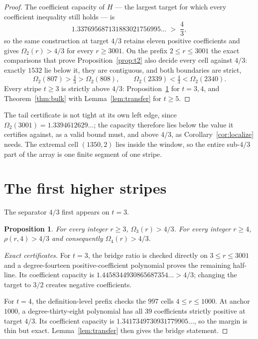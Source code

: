 \documentclass[11pt,a4paper]{article}
\theoremstyle{plain}
\newtheorem{proposition}[theorem]{Proposition}
\theoremstyle{remark}
\begin{document}
\begin{proof}
The coefficient capacity of $H$ --- the largest target for which every
coefficient inequality still holds --- is
\[
 1.337695687131883021756995\ldots\;>\;\frac43 ,
\]
so the same construction at target $4/3$ retains eleven positive
coefficients and gives $\Omega_2(r)>4/3$ for every $r\ge3001$.  On the prefix
$2\le r\le3001$ the exact comparisons that prove Proposition~\ref{prop:t2}
also decide every cell against $4/3$: exactly $1532$ lie below it, they are
contiguous, and both boundaries are strict,
\[
 \Omega_2(807)>\tfrac43>\Omega_2(808),
 \qquad
 \Omega_2(2339)<\tfrac43<\Omega_2(2340).
\]
Every stripe $t\ge3$ is strictly above $4/3$: Proposition~\ref{prop:t3t4}
for $t=3,4$, and Theorem~\ref{thm:bulk} with Lemma~\ref{lem:transfer} for
$t\ge5$.
\end{proof}

The tail certificate is not tight at its own left edge, since
$\Omega_2(3001)=1.3394612629\ldots$; the capacity therefore lies below the
value it certifies against, as a valid bound must, and above $4/3$, as
Corollary~\ref{cor:localize} needs.  The extremal cell $(1350,2)$ lies inside
the window, so the entire sub-$4/3$ part of the array is one finite segment
of one stripe.

\section{The first higher stripes}\label{sec:firststripes}

The separator $4/3$ first appears on $t=3$.

\begin{proposition}\label{prop:t3t4}
For every integer $r\ge3$, $\Omega_3(r)>4/3$.  For every integer $r\ge4$,
$\rho(r,4)>4/3$ and consequently $\Omega_4(r)>4/3$.
\end{proposition}

\begin{proof}[Exact certificates]
For $t=3$, the bridge ratio is checked directly on $3\le r\le3001$ and a
degree-fourteen positive-coefficient polynomial proves the remaining
half-line.  Its coefficient capacity is
$1.4458344930865687354\ldots>4/3$; changing the target to $3/2$ creates
negative coefficients.

For $t=4$, the definition-level prefix checks the $997$ cells
$4\le r\le1000$.  At anchor $1000$, a degree-thirty-eight polynomial has all
$39$ coefficients strictly positive at target $4/3$.  Its coefficient
capacity is $1.3417349730931779905\ldots$, so the margin is thin but exact.
Lemma~\ref{lem:transfer} then gives the bridge statement.
\end{proof}
\end{document}
